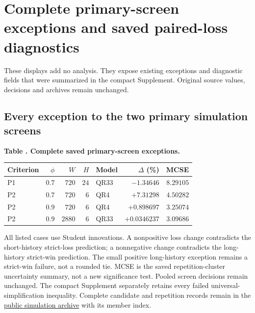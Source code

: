 \section{Complete primary-screen exceptions and saved paired-loss diagnostics}\label{sup:v9-complete-fields}
These displays add no analysis. They expose existing exceptions and diagnostic fields that were summarized in the compact Supplement. Original source values, decisions and archives remain unchanged.
\subsection*{Every exception to the two primary simulation screens}
\begingroup\small\setlength{\tabcolsep}{4pt}
\label{tab:v9-primary-exceptions}
\noindent\textbf{Table \thetable. Complete saved primary-screen exceptions.}\par
\begin{center}\begin{tabular}{lrrrlrr}\toprule
Criterion & $\phi$ & $W$ & $H$ & Model & $\Delta$ (\%) & MCSE \\\midrule
P1 & $0.7$ & $720$ & $24$ & QR33 & $-1.34646$ & $8.29105$ \\ %
P2 & $0.7$ & $720$ & $6$ & QR4 & $+7.31298$ & $4.50282$ \\ %
P2 & $0.9$ & $720$ & $6$ & QR4 & $+0.898697$ & $3.25074$ \\ %
P2 & $0.9$ & $2880$ & $6$ & QR33 & $+0.0346237$ & $3.09686$ \\ %
\bottomrule\end{tabular}\end{center}\endgroup
All listed cases use Student innovations. A nonpositive loss change contradicts the short-history strict-loss prediction; a nonnegative change contradicts the long-history strict-win prediction. The small positive long-history exception remains a strict-win failure, not a rounded tie. MCSE is the saved repetition-cluster uncertainty summary, not a new significance test. Pooled screen decisions remain unchanged.
The compact Supplement separately retains every failed universal-simplification inequality. Complete candidate and repetition records remain in the \href{https://github.com/ByronLi0207/financial-mathematics-paper-20261020/tree/revision-v8-goal/results/revision-v9/wp2}{public simulation archive} with its member index.
